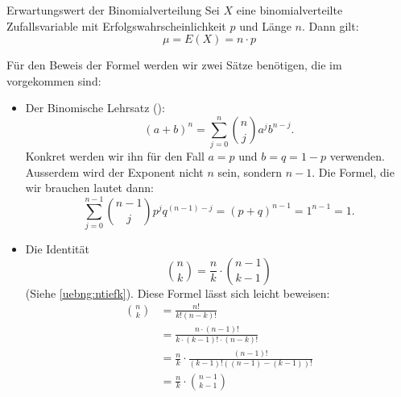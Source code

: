 \clearpage
\begin{satz}
    {Erwartungswert der Binomialverteilung}{}
    Sei \(X\) eine binomialverteilte Zufallsvariable mit Erfolgswahrscheinlichkeit \(p\) und Länge \(n\). Dann gilt:
    \[
        \mu = E(X) = n \cdot p
    \]
\end{satz}

Für den Beweis der Formel werden wir zwei Sätze benötigen, die im  vorgekommen sind:
\begin{itemize}
    \item Der Binomische Lehrsatz ():
          \[
              (a+b)^n = \sum_{j=0}^n \binom{n}{j} a^j b^{n-j}.
          \]
          Konkret werden wir ihn für den Fall \(a=p\) und \(b=q=1-p\) verwenden. Ausserdem wird der Exponent nicht \(n\) sein, sondern \(n-1\). Die Formel, die wir brauchen lautet dann:
          \[
              \sum_{j=0}^{n-1} \binom{n-1}{j} p^j q^{(n-1)-j} = (p+q)^{n-1} = 1^{n-1} = 1.
          \]
    \item Die Identität
          \[ \binom{n}{k} = \frac{n}{k} \cdot \binom{n-1}{k-1}\]
          (Siehe \cref{uebng:ntiefk}). Diese Formel lässt sich leicht beweisen:
          \begin{align*}
              \binom{n}{k} & = \frac{n!}{k!(n-k)!}                                   \\
                           & = \frac{n \cdot (n-1)!}{k \cdot (k-1)! \cdot (n-k)!}    \\
                           & = \frac{n}{k} \cdot \frac{(n-1)!}{(k-1)!((n-1)-(k-1))!} \\
                           & = \frac{n}{k} \cdot \binom{n-1}{k-1}
          \end{align*}
\end{itemize}

